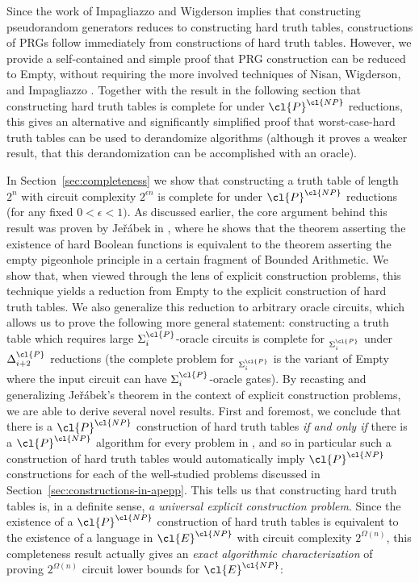 Since the work of Impagliazzo and Wigderson \cite{IW} implies that constructing pseudorandom generators reduces to constructing hard truth tables,  constructions of PRGs follow immediately from  constructions of hard truth tables. However, we provide a self-contained and simple proof that PRG construction can be reduced to {\sc Empty}, without requiring the more involved techniques of Nisan, Wigderson, and Impagliazzo \cite{NW}\cite{IW}. Together with the result in the following section that constructing hard truth tables is complete for  under $\cl{P}^\cl{NP}$ reductions, this gives an alternative and significantly simplified proof that worst-case-hard truth tables can be used to derandomize algorithms (although it proves a weaker result, that this derandomization can be accomplished with an  oracle).

In Section~\ref{sec:completeness} we show that constructing a truth table of length $2^n$ with circuit complexity $2^{\epsilon n}$ is complete for  under $\cl{P}^\cl{NP}$ reductions (for any fixed $0 < \epsilon < 1)$. As discussed earlier, the core argument behind this result was proven by Je\v{r}\'{a}bek in \cite{Jerabek}, where he shows that the theorem asserting the existence of hard Boolean functions is equivalent to the theorem asserting the empty pigeonhole principle in a certain fragment of Bounded Arithmetic. We show that, when viewed through the lens of explicit construction problems, this technique yields a reduction from {\sc Empty} to the explicit construction of hard truth tables. We also generalize this reduction to arbitrary oracle circuits, which allows us to prove the following more general statement: constructing a truth table which requires large $\Sigma^\cl{P}_i$-oracle circuits is complete for $_{\Sigma^\cl{P}_i}$ under $\Delta^\cl{P}_{i+2}$ reductions (the complete problem for $_{\Sigma^\cl{P}_i}$ is the variant of {\sc Empty} where the input circuit can have $\Sigma^\cl{P}_i$-oracle gates). By recasting and generalizing Je\v{r}\'{a}bek's theorem in the context of explicit construction problems, we are able to derive several novel results. First and foremost, we conclude that there is a $\cl{P}^\cl{NP}$ construction of hard truth tables \emph{if and only if} there is a $\cl{P}^\cl{NP}$ algorithm for every problem in , and so in particular such a construction of hard truth tables would automatically imply $\cl{P}^\cl{NP}$ constructions for each of the well-studied problems discussed in Section~\ref{sec:constructions-in-apepp}. This tells us that constructing hard truth tables is, in a definite sense, \emph{a universal explicit construction problem}. Since the existence of a $\cl{P}^\cl{NP}$ construction of hard truth tables is equivalent to the existence of a language in $\cl{E}^\cl{NP}$ with circuit complexity $2^{\Omega(n)}$, this completeness result actually gives an \emph{exact algorithmic characterization} of proving $2^{\Omega(n)}$ circuit lower bounds for $\cl{E}^\cl{NP}$:

